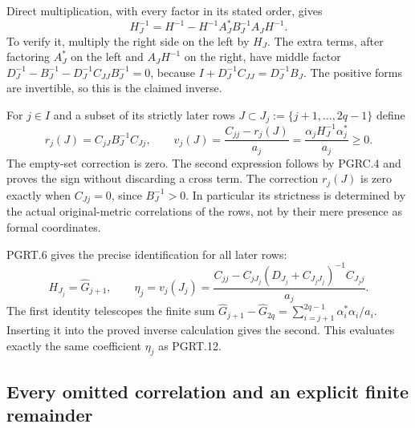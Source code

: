 Direct multiplication, with every factor in its stated order, gives
\[
 H_J^{-1}=H^{-1}-H^{-1}A_J^*B_J^{-1}A_JH^{-1}.
 \tag{PGRC.4}\label{eq:pgrc-subset-inverse}
\]
To verify it, multiply the right side on the left by $H_J$.
The extra terms, after factoring $A_J^*$ on the left and
$A_JH^{-1}$ on the right, have middle factor
$D_J^{-1}-B_J^{-1}-D_J^{-1}C_{JJ}B_J^{-1}=0$,
because $I+D_J^{-1}C_{JJ}=D_J^{-1}B_J$.
The positive forms are invertible, so this is the claimed inverse.

For $j\in I$ and a subset of its strictly later rows
$J\subset J_j:=\{j+1,\ldots,2q-1\}$ define
\[
 r_j(J)=C_{jJ}B_J^{-1}C_{Jj},\qquad
 v_j(J)=\frac{C_{jj}-r_j(J)}{a_j}
       =\frac{\alpha_jH_J^{-1}\alpha_j^*}{a_j}\geq0.
 \tag{PGRC.5}\label{eq:pgrc-correlation-removal}
\]
The empty-set correction is zero. The second expression follows
by PGRC.4 and proves the sign without discarding a cross term.
The correction $r_j(J)$ is zero exactly when $C_{Jj}=0$, since
$B_J^{-1}>0$. In particular its strictness is determined by the
actual original-metric correlations of the rows, not by their
mere presence as formal coordinates.

PGRT.6 gives the precise identification for all later rows:
\[
 H_{J_j}=\widehat G_{j+1},\qquad
 \eta_j=v_j(J_j)
  =\frac{C_{jj}-C_{jJ_j}(D_{J_j}+C_{J_jJ_j})^{-1}C_{J_jj}}{a_j}.
 \tag{PGRC.6}\label{eq:pgrc-exact-row}
\]
The first identity telescopes the finite sum
$\widehat G_{j+1}-\widehat G_{2q}
=\sum_{i=j+1}^{2q-1}\alpha_i^*\alpha_i/a_i$.
Inserting it into the proved inverse calculation gives the second.
This evaluates exactly the same coefficient $\eta_j$ as PGRT.12.

\subsection{Every omitted correlation and an explicit finite remainder}

